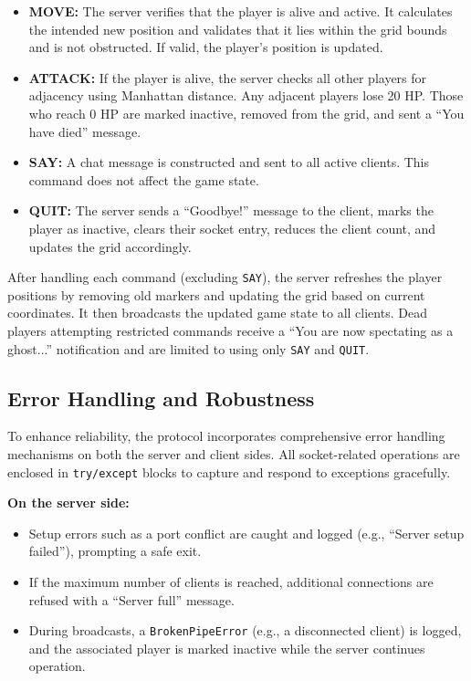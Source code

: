 \documentclass{article}
\begin{document}
\begin{itemize}
    \item \textbf{MOVE:} The server verifies that the player is alive and active. It calculates the intended new position and validates that it lies within the grid bounds and is not obstructed. If valid, the player’s position is updated.
    
    \item \textbf{ATTACK:} If the player is alive, the server checks all other players for adjacency using Manhattan distance. Any adjacent players lose 20 HP. Those who reach 0 HP are marked inactive, removed from the grid, and sent a “You have died” message.
    
    \item \textbf{SAY:} A chat message is constructed and sent to all active clients. This command does not affect the game state.
    
    \item \textbf{QUIT:} The server sends a “Goodbye!” message to the client, marks the player as inactive, clears their socket entry, reduces the client count, and updates the grid accordingly.
\end{itemize}

After handling each command (excluding \texttt{SAY}), the server refreshes the player positions by removing old markers and updating the grid based on current coordinates. It then broadcasts the updated game state to all clients. Dead players attempting restricted commands receive a “You are now spectating as a ghost...” notification and are limited to using only \texttt{SAY} and \texttt{QUIT}.

\subsection{Error Handling and Robustness}

To enhance reliability, the protocol incorporates comprehensive error handling mechanisms on both the server and client sides. All socket-related operations are enclosed in \texttt{try/except} blocks to capture and respond to exceptions gracefully.

\textbf{On the server side:}

\begin{itemize}
    \item Setup errors such as a port conflict are caught and logged (e.g., “Server setup failed”), prompting a safe exit.
    \item If the maximum number of clients is reached, additional connections are refused with a “Server full” message.
    \item During broadcasts, a \texttt{BrokenPipeError} (e.g., a disconnected client) is logged, and the associated player is marked inactive while the server continues operation.
\end{itemize}
\end{document}
